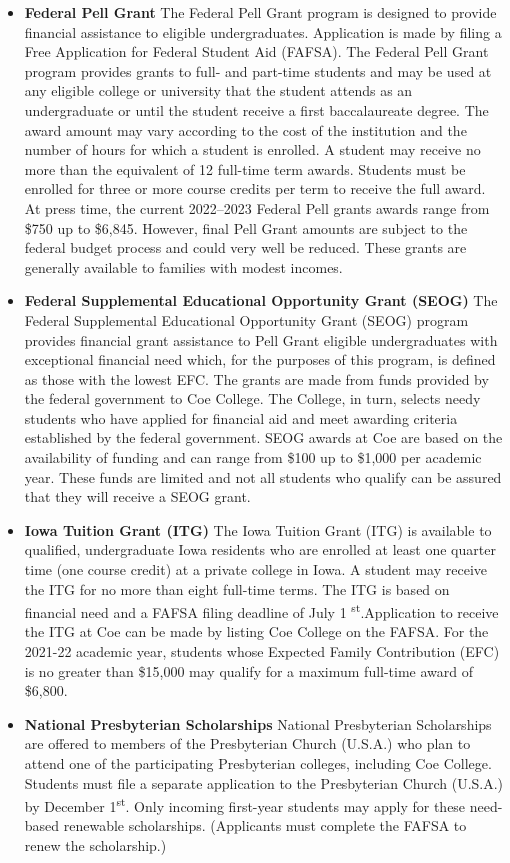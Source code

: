 \documentclass[
  letterpaper,
]{scrbook}
\begin{document}
\begin{itemize}
\item
  \textbf{Federal Pell Grant} The Federal Pell Grant program is designed
  to provide financial assistance to eligible undergraduates.
  Application is made by filing a Free Application for Federal Student
  Aid (FAFSA). The Federal Pell Grant program provides grants to full-
  and part-time students and may be used at any eligible college or
  university that the student attends as an undergraduate or until the
  student receive a first baccalaureate degree. The award amount may
  vary according to the cost of the institution and the number of hours
  for which a student is enrolled. A student may receive no more than
  the equivalent of 12 full-time term awards. Students must be enrolled
  for three or more course credits per term to receive the full award.
  At press time, the current 2022--2023 Federal Pell grants awards range
  from \$750 up to \$6,845. However, final Pell Grant amounts are
  subject to the federal budget process and could very well be reduced.
  These grants are generally available to families with modest incomes.
\item
  \textbf{Federal Supplemental Educational Opportunity Grant (SEOG)} The
  Federal Supplemental Educational Opportunity Grant (SEOG) program
  provides financial grant assistance to Pell Grant eligible
  undergraduates with exceptional financial need which, for the purposes
  of this program, is defined as those with the lowest EFC. The grants
  are made from funds provided by the federal government to Coe College.
  The College, in turn, selects needy students who have applied for
  financial aid and meet awarding criteria established by the federal
  government. SEOG awards at Coe are based on the availability of
  funding and can range from \$100 up to \$1,000 per academic year.
  These funds are limited and not all students who qualify can be
  assured that they will receive a SEOG grant.
\item
  \textbf{Iowa Tuition Grant (ITG)} The Iowa Tuition Grant (ITG) is
  available to qualified, undergraduate Iowa residents who are enrolled
  at least one quarter time (one course credit) at a private college in
  Iowa. A student may receive the ITG for no more than eight full-time
  terms. The ITG is based on financial need and a FAFSA filing deadline
  of July 1 \textsuperscript{st}.Application to receive the ITG at Coe
  can be made by listing Coe College on the FAFSA. For the 2021-22
  academic year, students whose Expected Family Contribution (EFC) is no
  greater than \$15,000 may qualify for a maximum full-time award of
  \$6,800.
\item
  \textbf{National Presbyterian Scholarships} National Presbyterian
  Scholarships are offered to members of the Presbyterian Church
  (U.S.A.) who plan to attend one of the participating Presbyterian
  colleges, including Coe College. Students must file a separate
  application to the Presbyterian Church (U.S.A.) by December
  1\textsuperscript{st}. Only incoming first-year students may apply for
  these need-based renewable scholarships. (Applicants must complete the
  FAFSA to renew the scholarship.)
\end{itemize}
\end{document}
